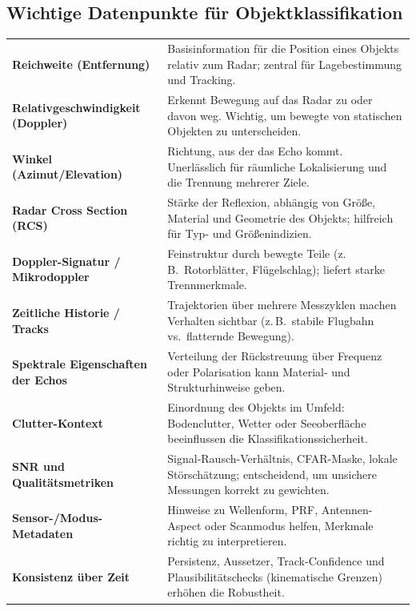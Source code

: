 \subsection{Wichtige Datenpunkte für Objektklassifikation} %
\begin{tabular}{p{} p{}}
\textbf{Reichweite (Entfernung)} & Basisinformation für die Position eines Objekts relativ zum Radar; zentral für Lagebestimmung und Tracking. \\[0.5em]
\textbf{Relativgeschwindigkeit (Doppler)} & Erkennt Bewegung auf das Radar zu oder davon weg. Wichtig, um bewegte von statischen Objekten zu unterscheiden. \\[0.5em]
\textbf{Winkel (Azimut/Elevation)} & Richtung, aus der das Echo kommt. Unerlässlich für räumliche Lokalisierung und die Trennung mehrerer Ziele. \\[0.5em]
\textbf{Radar Cross Section (RCS)} & Stärke der Reflexion, abhängig von Größe, Material und Geometrie des Objekts; hilfreich für Typ- und Größenindizien. \\[0.5em]
\textbf{Doppler-Signatur / Mikrodoppler} & Feinstruktur durch bewegte Teile (z.\,B.\ Rotorblätter, Flügelschlag); liefert starke Trennmerkmale. \\[0.5em]
\textbf{Zeitliche Historie / Tracks} & Trajektorien über mehrere Messzyklen machen Verhalten sichtbar (z.\,B.\ stabile Flugbahn vs.\ flatternde Bewegung). \\[0.5em]
\textbf{Spektrale Eigenschaften der Echos} & Verteilung der Rückstreuung über Frequenz oder Polarisation kann Material- und Strukturhinweise geben. \\[0.5em]
\textbf{Clutter-Kontext} & Einordnung des Objekts im Umfeld: Bodenclutter, Wetter oder Seeoberfläche beeinflussen die Klassifikationssicherheit. \\[0.5em]
\textbf{SNR und Qualitätsmetriken} & Signal-Rausch-Verhältnis, CFAR-Maske, lokale Störschätzung; entscheidend, um unsichere Messungen korrekt zu gewichten. \\[0.5em]
\textbf{Sensor-/Modus-Metadaten} & Hinweise zu Wellenform, PRF, Antennen-Aspect oder Scanmodus helfen, Merkmale richtig zu interpretieren. \\[0.5em]
\textbf{Konsistenz über Zeit} & Persistenz, Aussetzer, Track-Confidence und Plausibilitätschecks (kinematische Grenzen) erhöhen die Robustheit. \\
\end{tabular}

